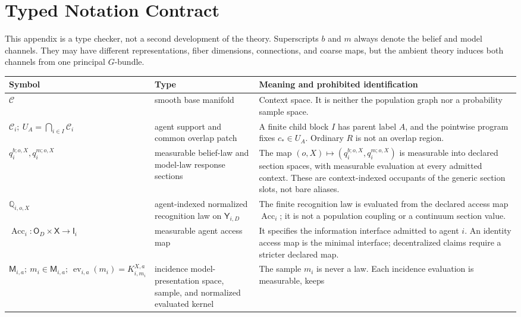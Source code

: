 \chapter{Typed Notation Contract}
\label{app:notation-contract}

This appendix is a type checker, not a second development of the theory.
Superscripts \(b\) and \(m\) always denote the belief and model channels.
They may have different representations, fiber dimensions, connections, and
coarse maps, but the ambient theory induces both channels from one principal
\(G\)-bundle.

\footnotesize
\renewcommand{\arraystretch}{1.05}
\begin{longtable}{@{}>{\raggedright\arraybackslash}p{}
>{\raggedright\arraybackslash}p{}
>{\raggedright\arraybackslash}p{}@{}}
\toprule
Symbol & Type & Meaning and prohibited identification \\
\midrule
\(\mathcal C\) &
smooth base manifold &
Context space.  It is neither the population graph nor a probability
sample space. \\
\(\mathcal C_i;\ U_A=\bigcap_{i\in I}\mathcal C_i\) &
agent support and common overlap patch &
A finite child block \(I\) has parent label \(A\), and the pointwise program fixes
\(c_*\in U_A\). Ordinary \(R\) is not an
overlap region. \\
\(q_i^{b;o,X},q_i^{m;o,X}\) &
measurable belief-law and model-law response sections &
The map \((o,X)\mapsto(q_i^{b;o,X},q_i^{m;o,X})\) is measurable into declared
section spaces, with measurable evaluation at every admitted context. These are
context-indexed occupants of the generic section slots, not bare aliases. \\
\(\mathbb Q_{i,o,X}\) &
agent-indexed normalized recognition law on \(\mathsf Y_{i,D}\) &
The finite recognition law is evaluated from the declared access map
\(\operatorname{Acc}_i\); it is not a population coupling or a continuum section value. \\
\(\operatorname{Acc}_i:\mathsf O_D\times\mathsf X\to\mathsf I_i\) &
measurable agent access map &
It specifies the information interface admitted to agent \(i\). An identity access map is
the minimal interface; decentralized claims require a stricter declared map. \\
\(\mathsf M_{i,a};\ m_i\in\mathsf M_{i,a};\
\operatorname{ev}_{i,a}(m_i)=K^{X,a}_{i,m_i}\) &
incidence model-presentation space, sample, and normalized evaluated kernel &
The sample \(m_i\) is never a law. Each incidence evaluation is measurable, keeps

\end{longtable}
